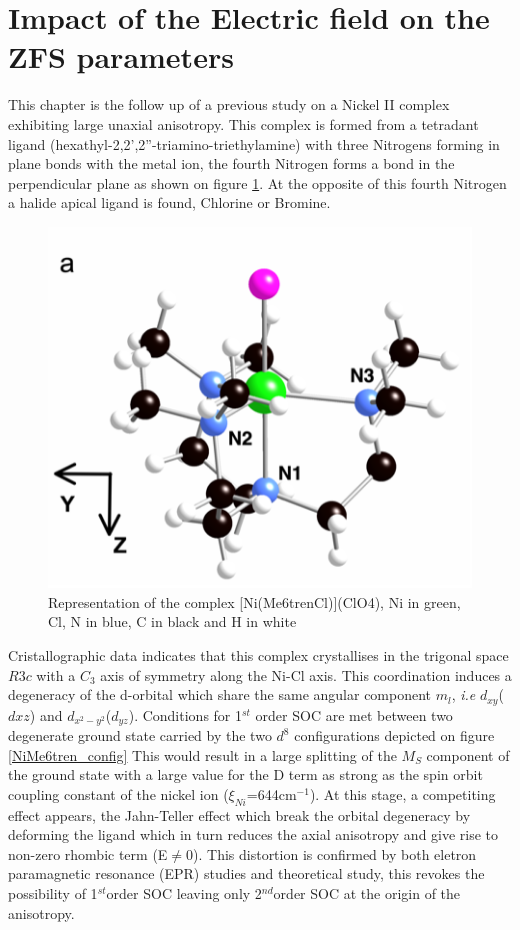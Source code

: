\documentclass[10pt]{report}
\numberwithin{equation}{section}
\begin{document}
\section{Impact of the Electric field on the ZFS parameters}

This chapter is the follow up of a previous study on a Nickel II complex exhibiting large unaxial anisotropy.
This complex is formed from a tetradant ligand (hexathyl-2,2',2''-triamino-triethylamine) with three Nitrogens forming in plane bonds with the metal ion, the fourth Nitrogen forms a bond in the perpendicular plane as shown on figure \ref{NiMe6tren}.
At the opposite of this fourth Nitrogen a halide apical ligand is found, Chlorine or Bromine.

\begin{figure}[h!]
    \centering
    \includegraphics{Images/NiMe6trenTalal.png}
    \caption{Representation of the complex [Ni(Me6trenCl)](ClO4), Ni in green, Cl, N in blue, C in black and H in white}
    \label{NiMe6tren}
\end{figure}

Cristallographic data indicates that this complex crystallises in the trigonal space $R3c$ with a $C_3$ axis of symmetry along the Ni-Cl axis.
This coordination induces a degeneracy of the d-orbital which share the same angular component $m_l$, \textit{i.e} $d_{xy}$($d{xz}$) and $d_{x^2-y^2}$($d_{yz}$). 
Conditions for 1$^{st}$ order SOC are met between two degenerate ground state carried by the two $d^8$ configurations depicted on figure \ref{NiMe6tren_config}
This would result in a large splitting of the $M_S$ component of the ground state with a large value for the D term as strong as the spin orbit coupling constant of the nickel ion ($\xi_{Ni}$=644cm$^{-1}$).
At this stage, a competiting effect appears, the Jahn-Teller effect which break the orbital degeneracy by deforming the ligand which in turn reduces the axial anisotropy and give rise to non-zero rhombic term (E$\neq$0).
This distortion is confirmed by both eletron paramagnetic resonance (EPR) studies and theoretical study, this revokes the possibility of 1$^{st}$order SOC leaving only 2$^{nd}$order SOC at the origin of the anisotropy.
\end{document}
